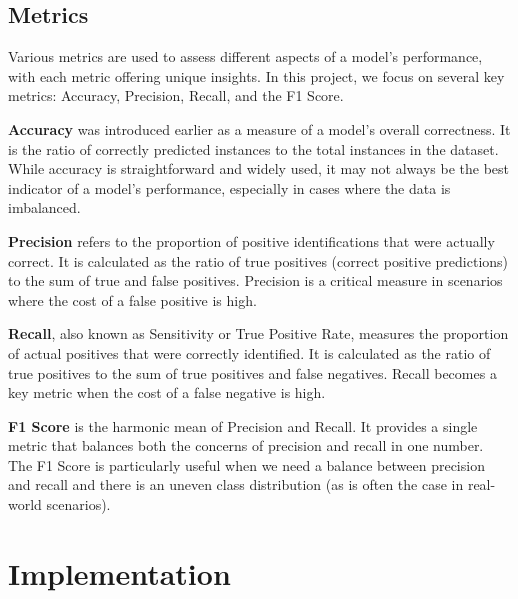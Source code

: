 \documentclass[letterpaper,10pt]{article}
\begin{document}
\subsection{Metrics} \label{withinscopefinish}
Various metrics are used to assess different aspects of a model's performance, with each metric offering unique insights. In this project, we focus on several key metrics: Accuracy, Precision, Recall, and the F1 Score. \par

\textbf{Accuracy} was introduced earlier as a measure of a model's overall correctness. It is the ratio of correctly predicted instances to the total instances in the dataset. While accuracy is straightforward and widely used, it may not always be the best indicator of a model's performance, especially in cases where the data is imbalanced. \par

\textbf{Precision} refers to the proportion of positive identifications that were actually correct. It is calculated as the ratio of true positives (correct positive predictions) to the sum of true and false positives. Precision is a critical measure in scenarios where the cost of a false positive is high. \par

\textbf{Recall}, also known as Sensitivity or True Positive Rate, measures the proportion of actual positives that were correctly identified. It is calculated as the ratio of true positives to the sum of true positives and false negatives. Recall becomes a key metric when the cost of a false negative is high. \par

\textbf{F1 Score} is the harmonic mean of Precision and Recall. It provides a single metric that balances both the concerns of precision and recall in one number. The F1 Score is particularly useful when we need a balance between precision and recall and there is an uneven class distribution (as is often the case in real-world scenarios). \par



\newpage
\section{Implementation} \label{currentwork}
\end{document}
